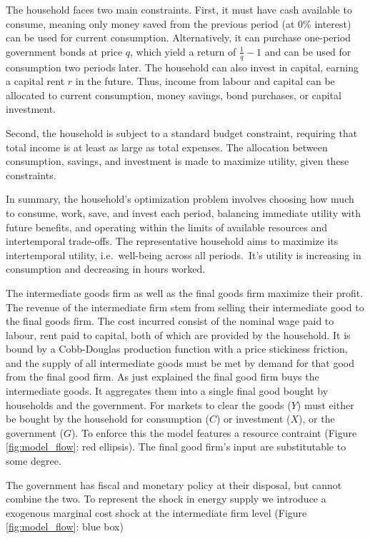 \documentclass[12pt]{article}
\begin{document}
The household faces two main constraints. First, it must have cash available to consume, meaning only money saved from the previous period (at 0\% interest) can be used for current consumption. Alternatively, it can purchase one-period government bonds at price $q$, which yield a return of $\frac{1}{q} - 1$ and can be used for consumption two periods later. The household can also invest in capital, earning a capital rent $r$ in the future. Thus, income from labour and capital can be allocated to current consumption, money savings, bond purchases, or capital investment.

Second, the household is subject to a standard budget constraint, requiring that total income is at least as large as total expenses. The allocation between consumption, savings, and investment is made to maximize utility, given these constraints.

In summary, the household's optimization problem involves choosing how much to consume, work, save, and invest each period, balancing immediate utility with future benefits, and operating within the limits of available resources and intertemporal trade-offs.
The representative household aims to maximize its intertemporal utility, i.e.~well-being across all periods.\ It's utility is increasing in consumption and decreasing in hours worked. 

The intermediate goods firm as well as the final goods firm maximize their profit. The revenue of the intermediate firm stem from selling their intermediate good to the final goods firm. The cost incurred consist of the nominal wage paid to labour, rent paid to capital, both of which are provided by the household. It is bound by a Cobb-Douglas production function with a price stickiness friction, and the supply of all intermediate goods must be met by demand for that good from the final good firm.  As just explained the final good firm buys the intermediate goods. It aggregates them into a single final good bought by households and the government. For markets to clear the goods ($Y$) must either be bought by the household for consumption ($C$) or investment ($X$), or the government ($G$). To enforce this the model features a resource contraint (Figure \ref{fig:model_flow}: red ellipsis). The final good firm's input are substitutable to some degree. 

The government has fiscal and monetary policy at their disposal, but cannot combine the two. To represent the shock in energy supply we introduce a exogenous marginal cost shock at the intermediate firm level (Figure \ref{fig:model_flow}: blue box)
\end{document}
